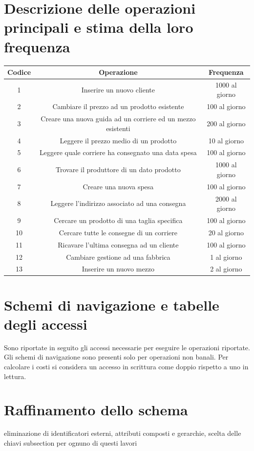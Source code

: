 \documentclass[a4paper,12pt]{report}
\begin{document}
\section{Descrizione delle operazioni principali e stima della loro frequenza}
\begin{center}
    \begin{tabular}{ | c | c | c |} 
    \hline
    Codice&Operazione&Frequenza\\
    \hline
	1&Inserire un nuovo cliente&1000 al giorno\\
	\hline
	2&Cambiare il prezzo ad un prodotto esistente&100 al giorno\\
	\hline
	3&Creare una nuova guida ad un corriere ed un mezzo esistenti&200 al giorno\\
	\hline
	4&Leggere il prezzo medio di un prodotto&10 al giorno\\
	\hline
	5&Leggere quale corriere ha consegnato una data spesa&100 al giorno\\
	\hline
	6&Trovare il produttore di un dato prodotto&1000 al giorno\\
	\hline
	7&Creare una nuova spesa&100 al giorno\\
	\hline
	8&Leggere l'indirizzo associato ad una consegna&2000 al giorno\\
	\hline
	9&Cercare un prodotto di una taglia specifica&100 al giorno\\
	\hline 
	10&Cercare tutte le consegne di un corriere&20 al giorno\\
	\hline
	11&Ricavare l'ultima consegna ad un cliente&100 al giorno\\
	\hline
	12&Cambiare gestione ad una fabbrica&1 al giorno\\
	\hline
	13&Inserire un nuovo mezzo&2 al giorno\\
	\hline
    \end{tabular}
\end{center}
\section{Schemi di navigazione e tabelle degli accessi}
Sono riportate in seguito gli accessi necessarie per eseguire le operazioni riportate. 
Gli schemi di navigazione sono presenti solo per operazioni non banali. Per calcolare i costi si considera un accesso in scrittura come doppio rispetto a uno in lettura.
\section{Raffinamento dello schema}
eliminazione di identificatori esterni, attributi composti e gerarchie, scelta delle chiavi
subsection per ognuno di questi lavori
\end{document}
